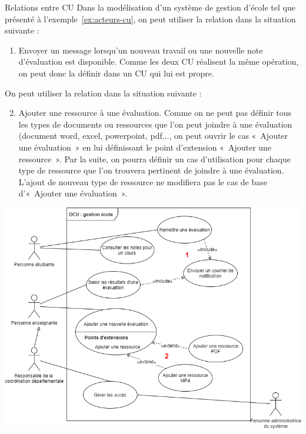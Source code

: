 \begin{exemple}{Relations entre \acrshort{CU}}
	Dans la modélisation d'un système de gestion d'école tel que présenté à l'exemple~\ref{ex:acteurs-cu}, on peut utiliser la relation  dans la situation suivante :
	
	\begin{enumerate}
		\item Envoyer un message lorsqu'un nouveau travail ou une nouvelle note d'évaluation est disponible. Comme les deux \acrshort{CU} réalisent la même opération, on peut donc la définir dans un \acrshort{CU} qui lui est propre. 
	\end{enumerate}
	
	On peut utiliser la relation  dans la situation suivante :
	
	\begin{enumerate}
		\setcounter{enumi}{1}
		\item Ajouter une ressource à une évaluation. Comme on ne peut pas définir tous les types de documents ou ressources que l'on peut joindre à une évaluation  (document word, excel, powerpoint, pdf..., on peut ouvrir le cas «~Ajouter une évaluation~» en lui définissant le point d'extension «~Ajouter une ressource~». Par la suite, on pourra définir un cas d'utilisation pour chaque type de ressource que l'on trouvera pertinent de joindre à une évaluation. L'ajout de nouveau type de ressource ne modifiera pas le cas de base d'«~Ajouter une évaluation~».
	\end{enumerate}
	
	\pagebreak
	
	\begin{center} 
		\includegraphics[width=.95\textwidth]{cas-utilisation-Exemple include et extend.drawio.png}
	\end{center} 
	
\end{exemple}


